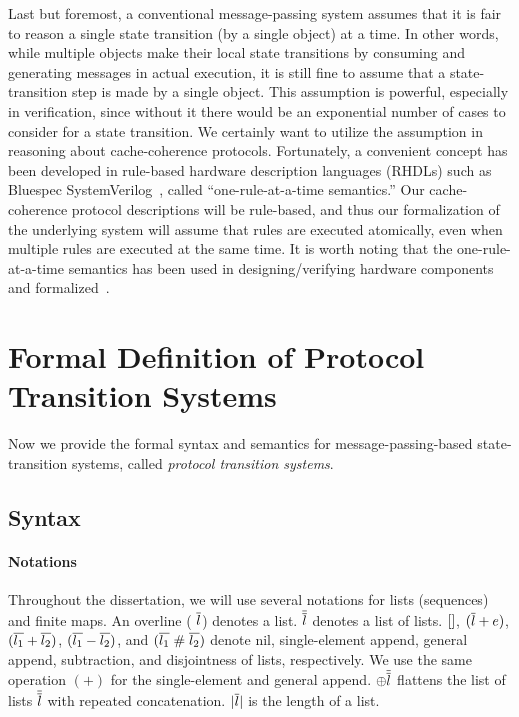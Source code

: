 Last but foremost, a conventional message-passing system assumes that it is fair to reason a single state transition (by a single object) at a time.
In other words, while multiple objects make their local state transitions by consuming and generating messages in actual execution, it is still fine to assume that a state-transition step is made by a single object.
This assumption is powerful, especially in verification, since without it there would be an exponential number of cases to consider for a state transition.
We certainly want to utilize the assumption in reasoning about cache-coherence protocols.
Fortunately, a convenient concept has been developed in rule-based hardware description languages (RHDLs) such as Bluespec SystemVerilog~\cite{bluespec}, called ``one-rule-at-a-time semantics.''
Our cache-coherence protocol descriptions will be rule-based, and thus our formalization of the underlying system will assume that rules are executed atomically, even when multiple rules are executed at the same time.
It is worth noting that the one-rule-at-a-time semantics has been used in designing/verifying hardware components~\cite{Murali:2015,Dave:2005,Dave:2007} and formalized~\cite{fesi,kami,koika}.

\section{Formal Definition of Protocol Transition Systems}

Now we provide the formal syntax and semantics for message-passing-based state-transition systems, called \emph{protocol transition systems}.

\subsection{Syntax}
\label{sec-syntax}

\paragraph{Notations}
Throughout the dissertation, we will use several notations for lists (sequences) and finite maps.
An overline (\eg{} $\overline{l}$) denotes a list.
$\overline{\overline{l}}$ denotes a list of lists.
$\lbrack\rbrack{}$, $(\overline{l} + e)$, $(\overline{l_1} + \overline{l_2})$, $(\overline{l_1} - \overline{l_2})$, and
$(\overline{l_1} \; \# \; \overline{l_2})$ denote nil, single-element append, general append, subtraction, and disjointness of lists, respectively.
We use the same operation $(+)$ for the single-element and general append.
$\oplus \overline{\overline{l}}$ flattens the list of lists $\overline{\overline{l}}$ with repeated concatenation.
$| \overline{l} |$ is the length of a list.


